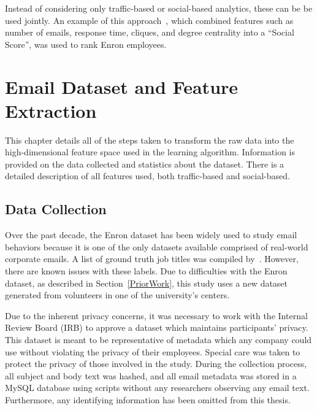\documentclass[12pt]{report}
\begin{document}
Instead of considering only traffic-based or social-based analytics, these can be be used jointly.
An example of this approach~\cite{rowe_automated_2007}, which combined features such as number of emails, response time, cliques, and degree centrality into a ``Social Score'', was used to rank Enron employees.  

\chapter{Email Dataset and Feature Extraction} \label{Data}

This chapter details all of the steps taken to transform the raw data into the high-dimensional feature space used in the learning algorithm.
Information is provided on the data collected and statistics about the dataset.
There is a detailed description of all features used, both traffic-based and social-based.

\section{Data Collection}
Over the past decade, the Enron dataset has been widely used to study email behaviors because it is one of the only datasets available comprised of real-world corporate emails.
A list of ground truth job titles was compiled by~\cite{shetty_status_2004}.  However, there are known issues with these labels.
Due to difficulties with the Enron dataset, as described in Section~\ref{PriorWork}, this study uses a new dataset generated from volunteers in one of the university's centers.

Due to the inherent privacy concerns, it was necessary to work with the Internal Review Board (IRB) to approve a dataset which maintains participants' privacy.
This dataset is meant to be representative of metadata which any company could use without violating the privacy of their employees.
Special care was taken to protect the privacy of those involved in the study.
During the collection process, all subject and body text was hashed, and all email metadata was stored in a MySQL database using scripts without any researchers observing any email text.
Furthermore, any identifying information has been omitted from this thesis.
\end{document}
